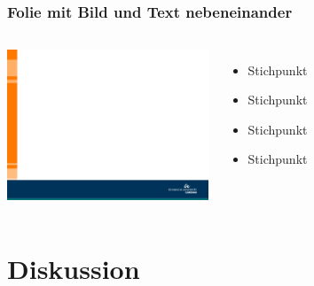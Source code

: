 \subsection*{}
\begin{frame}
\frametitle{Folie mit Bild und Text nebeneinander}
	\begin{columns}
		\column{6cm}
		\vskip5mm
		\includegraphics[width=6.0cm]{style/images/master_background}\\
		\vskip5mm
    	\column{5cm}

		\begin{itemize}
		 \item Stichpunkt\newline
      	 \item Stichpunkt\newline
       	 \item Stichpunkt\newline
     	 \item Stichpunkt\newline
		\end{itemize}
	\end{columns}
\end{frame}

\section{Diskussion}

